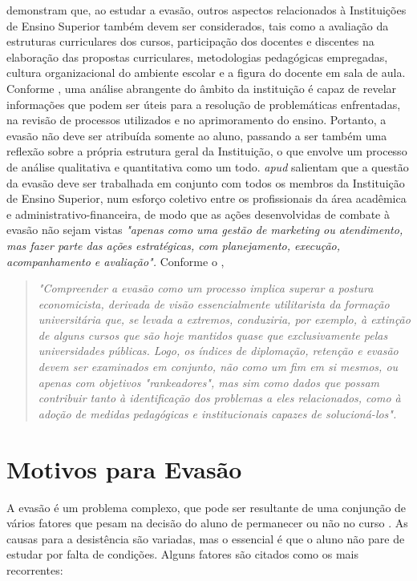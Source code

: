 \citet{braga2003} demonstram que, ao estudar a evasão, outros aspectos relacionados à Instituições de Ensino Superior também devem ser considerados, tais como a avaliação da estruturas curriculares dos cursos, participação dos docentes e discentes na elaboração das propostas curriculares, metodologias pedagógicas empregadas, cultura organizacional do ambiente escolar e a figura do docente em sala de aula. Conforme \citet{baggi_lopes2010}, uma análise abrangente do âmbito da instituição é capaz de revelar informações que podem ser úteis para a resolução de problemáticas enfrentadas, na revisão de processos utilizados e no aprimoramento do ensino. Portanto, a evasão não deve ser atribuída somente ao aluno, passando a ser também uma reflexão sobre a própria estrutura geral da Instituição, o que envolve um processo de análise qualitativa e quantitativa como um todo. \citet[p. 59]{favero2013}  \textit{apud} \citet{lobo2011} salientam que a questão da evasão deve ser trabalhada em conjunto com todos os membros da Instituição de Ensino Superior, num esforço coletivo entre os profissionais da área acadêmica e administrativo-financeira, de modo que as ações desenvolvidas de combate à evasão não sejam vistas \textit{"apenas como uma gestão de marketing ou atendimento, mas fazer parte das ações estratégicas, com planejamento, execução, acompanhamento e avaliação".} Conforme o \citet[p. 19]{mec_1997}, 
\begin{quotation}
\textit{"Compreender a evasão como um processo implica superar a postura economicista, derivada de visão essencialmente utilitarista da formação universitária que, se levada a extremos, conduziria, por exemplo, à extinção de alguns cursos que são hoje mantidos quase que exclusivamente pelas universidades públicas. Logo, os índices de diplomação, retenção e evasão devem ser examinados em conjunto, não como um fim em si mesmos, ou apenas com objetivos "rankeadores", mas sim como dados que possam contribuir tanto à identificação dos problemas a eles relacionados, como à adoção de medidas pedagógicas e institucionais capazes de solucioná-los".}
\end{quotation}

\section{Motivos para Evasão} \label{2title3}

A evasão é um problema complexo, que pode ser resultante de uma conjunção de vários fatores que pesam na decisão do aluno de permanecer ou não no curso \cite{tigrinho2008}. As causas para a desistência são variadas, mas o essencial é que o aluno não pare de estudar por falta de condições. Alguns fatores são citados como os mais recorrentes:

